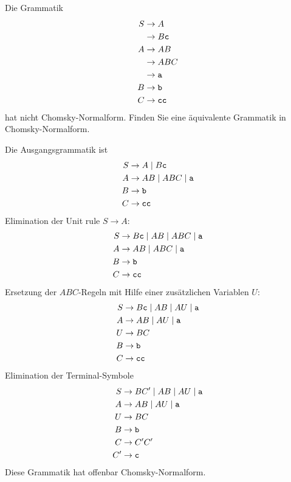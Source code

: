 Die Grammatik
\begin{align*}
S&\to A\\
 &\to B{\tt c}\\
A&\to AB\\
 &\to ABC\\
 &\to {\tt a}\\
B&\to {\tt b}\\
C&\to {\tt cc}
\end{align*}
hat nicht Chomsky-Normalform. Finden Sie eine äquivalente Grammatik
in Chomsky-Normalform.


\begin{loesung}
Die Ausgangsgrammatik ist
\begin{align*}
S&\to A\;|\;B{\tt c}\\
A&\to AB\;|\;ABC\;|\;{\tt a}\\
B&\to {\tt b}\\
C&\to {\tt cc}
\end{align*}
Elimination der Unit rule $S\to A$:
\begin{align*}
S&\to B{\tt c}\;|\;AB\;|\;ABC\;|\;{\tt a}\\
A&\to AB\;|\;ABC\;|\;{\tt a}\\
B&\to {\tt b}\\
C&\to {\tt cc}
\end{align*}
Ersetzung der $ABC$-Regeln mit Hilfe einer zusätzlichen
Variablen $U$:
\begin{align*}
S&\to B{\tt c}\;|\;AB\;|\;AU\;|\;{\tt a}\\
A&\to AB\;|\;AU\;|\;{\tt a}\\
U&\to BC\\
B&\to {\tt b}\\
C&\to {\tt cc}
\end{align*}
Elimination der Terminal-Symbole
\begin{align*}
S&\to BC'\;|\;AB\;|\;AU\;|\;{\tt a}\\
A&\to AB\;|\;AU\;|\;{\tt a}\\
U&\to BC\\
B&\to {\tt b}\\
C&\to C'C'\\
C'&\to {\tt c}\\
\end{align*}
Diese Grammatik hat offenbar Chomsky-Normalform.
\end{loesung}
